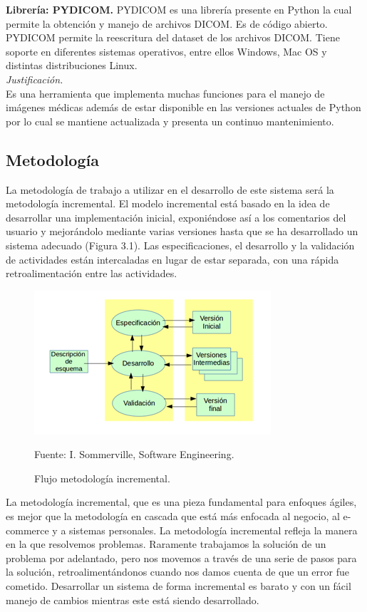 \documentclass[12pt]{report}
\begin{document}
\textbf{Librería: PYDICOM. }
PYDICOM es una librería presente en Python la cual permite la obtención y manejo de archivos DICOM. Es de código abierto. PYDICOM permite la reescritura del dataset de los archivos DICOM. Tiene soporte en diferentes sistemas operativos, entre ellos Windows, Mac OS y distintas distribuciones Linux.\\

\textit{Justificación.}\\ Es una herramienta que implementa muchas funciones para el manejo de imágenes médicas además de estar disponible en las versiones actuales de Python por lo cual se mantiene actualizada y presenta un continuo mantenimiento.

\subsection{Metodología}
La metodología de trabajo a utilizar en el desarrollo de este sistema será la metodología incremental. El modelo incremental está basado en la idea de desarrollar una implementación inicial, exponiéndose así a los comentarios del usuario y mejorándolo mediante varias versiones hasta que se ha desarrollado un sistema adecuado (Figura 3.1). Las especificaciones, el desarrollo y la validación de actividades están intercaladas en lugar de estar separada, con una rápida retroalimentación entre las actividades.\cite{meto}

\begin{figure}[H]
\centering
\includegraphics[width = 12 cm, height = 7 cm]{incre}
\caption{Flujo metodología incremental.}
Fuente: I. Sommerville, Software Engineering.
\end{figure}

La metodología incremental, que es una pieza fundamental para enfoques ágiles, es mejor que la metodología en cascada que está más enfocada al negocio, al e-commerce y a sistemas personales. La metodología incremental refleja la manera en la que resolvemos problemas. Raramente trabajamos la solución de un problema por adelantado, pero nos movemos a través de una serie de pasos para la solución, retroalimentándonos cuando nos damos cuenta de que un error fue cometido. Desarrollar un sistema de forma incremental es barato y con un fácil manejo de cambios mientras este está siendo desarrollado.\cite{meto}\\
\end{document}

